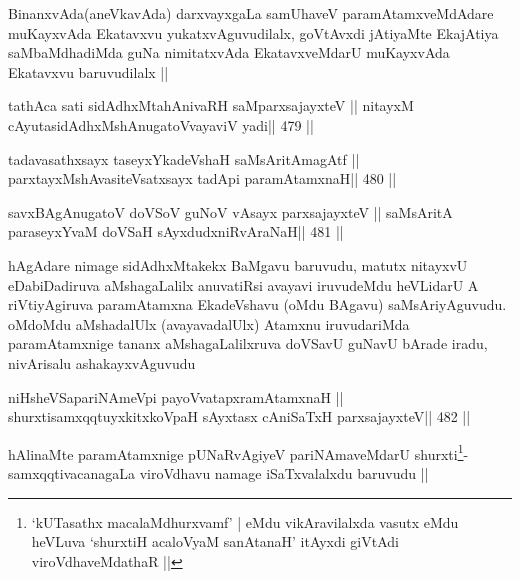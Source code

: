 \begin{artha}
BinanxvAda(aneVkavAda) darxvayxgaLa samUhaveV paramAtamxveMdAdare
muKayxvAda Ekatavxvu yukatxvAguvudilalx, goVtAvxdi jAtiyaMte EkajAtiya
saMbaMdhadiMda guNa nimitatxvAda EkatavxveMdarU muKayxvAda Ekatavxvu
baruvudilalx ||
\end{artha}



\begin{shl}
tathAca sati sidAdhxMtahAnivaRH saMparxsajayxteV ||
nitayxM cAyutasidAdhxMshAnugatoV\s vayaviV yadi\hfill || 479 ||
\end{shl}

\begin{shl}
tadavasathxsayx taseyxYkadeVshaH saMsAritAmagAtf ||
parxtayxMshAvasiteVsatxsayx tadA\s pi paramAtamxnaH\hfill || 480 ||
\end{shl}

\begin{shl}
savxBAgAnugatoV doVSoV guNoV vA\s sayx parxsajayxteV ||
saMsAritA paraseyxYvaM doVSaH sAyxdudxniRvAraNaH\hfill || 481 ||
\end{shl}

\begin{artha}
hAgAdare nimage sidAdhxMtakekx BaMgavu baruvudu, matutx nitayxvU
eDabiDadiruva aMshagaLalilx anuvatiRsi avayavi iruvudeMdu heVLidarU A
riVtiyAgiruva paramAtamxna EkadeVshavu (oMdu BAgavu) saMsAriyAguvudu.
oMdoMdu aMshadalUlx (avayavadalUlx) Atamxnu iruvudariMda
paramAtamxnige tananx aMshagaLalilxruva doVSavU guNavU bArade iradu,
nivArisalu ashakayxvAguvudu
\end{artha}


\begin{shl}
niHsheVSapariNAmeV\s pi payoVvatapxramAtamxnaH ||
shurxtisamxqqtuyxkitxkoVpaH sAyxtasx cAniSaTxH parxsajayxteV\hfill || 482 ||
\end{shl}

\begin{artha}
hAlinaMte paramAtamxnige pUNaRvAgiyeV pariNAmaveMdarU
shurxti\footnote[1]{`kUTasathx macalaMdhurxvamf' | eMdu vikAravilalxda
  vasutx eMdu heVLuva `shurxtiH acaloV\s yaM sanAtanaH' itAyxdi giVtAdi
viroVdhaveMdathaR ||}-samxqqtivacanagaLa viroVdhavu namage iSaTxvalalxdu
baruvudu ||
\end{artha}



